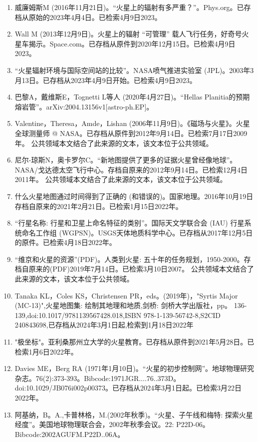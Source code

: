 \begin{enumerate}
\item 威廉姆斯M (2016年11月21日)。“火星上的辐射有多严重？”。Phys.org。已存档从原始的2023年4月4日。已检索4月9日2023。
\item Wall M (2013年12月9日)。火星上的辐射 “可管理” 载人飞行任务，好奇号火星车揭示。Space.com。已存档从原件到2020年12月15日。已检索4月9日2023。
\item “火星辐射环境与国际空间站的比较”。NASA喷气推进实验室 (JPL)。2003年3月13日。已存档从2023年4月9日开始。已检索4月9日2023。
\item 巴黎A，戴维斯E，Tognetti L等人 (2020年4月27日)。“Hellas Planitia的预期熔岩管”。arXiv:2004.13156v1[astro-ph.EP]。
\item Valentine，Theresa，Amde，Lishan (2006年11月9日)。《磁场与火星》。火星全球测量师 @ NASA。已存档从原件到2012年9月14日。已检索7月17日2009年。 公共领域本文结合了此来源的文本，该文本位于公共领域。
\item 尼尔-琼斯N，奥卡罗尔C。“新地图提供了更多的证据火星曾经像地球”。NASA/戈达德太空飞行中心。存档自原来的2012年9月14日。已检索12月4日2011年。 公共领域本文结合了此来源的文本，该文本位于公共领域。
\item 什么火星地图通过时间得到了正确的 (和错误的)。国家地理。2016年10月19日存档自原来的2021年2月21日。已检索1月15日2022年。
\item “行星名称: 行星和卫星上命名特征的类别”。国际天文学联合会 (IAU) 行星系统命名工作组 (WGPSN)。USGS天体地质科学中心。已存档从2017年12月5日的原件。已检索4月18日2022年。
\item “维京和火星的资源”(PDF)。人类到火星: 五十年的任务规划，1950-2000。存档自原来的(PDF)2019年7月14日。已检索3月10日2007。 公共领域本文结合了此来源的文本，该文本位于公共领域。
\item Tanaka KL，Coles KS，Christensen PR，eds。(2019年)，"Syrtis Major (MC-13)",火星地图集: 绘制其地理和地质,剑桥: 剑桥大学出版社，pp。 136-139,doi:10.1017/9781139567428.018,ISBN 978-1-139-56742-8,S2CID 240843698,已存档从2024年3月1日起,检索到1月18日2022年
\item "极坐标"。亚利桑那州立大学的火星教育。已存档从原件到2021年5月28日。已检索1月6日2022年。
\item Davies ME，Berg RA (1971年1月10日)。“火星的初步控制网”。地球物理研究杂志。76(2):373-393。Bibcode:1971JGR....76..373D。doi:10.1029/JB076i002p00373。已存档从2024年3月1日起。已检索3月22日2022年。
\item 阿基纳，B。A.,卡普林格，M.(2002年秋季)。“火星、子午线和梅特: 探索火星经度”。美国地球物理联合会，2002年秋季会议。22: P22D-06。Bibcode:2002AGUFM.P22D..06A。

\end{enumerate}
